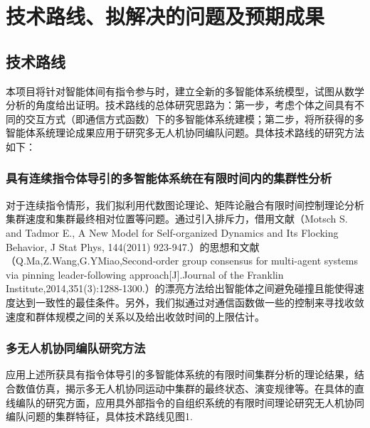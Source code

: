 
\section{技术路线、拟解决的问题及预期成果}

\subsection{技术路线}

本项目将针对智能体间有指令参与时，建立全新的多智能体系统模型，试图从数学分析的角度给出证明。技术路线的总体研究思路为：第一步，考虑个体之间具有不同的交互方式（即通信方式函数）下的多智能体系统建模；第二步，将所获得的多智能体系统理论成果应用于研究多无人机协同编队问题。具体技术路线的研究方法如下：

\subsubsection{具有连续指令体导引的多智能体系统在有限时间内的集群性分析}

对于连续指令情形，我们拟利用代数图论理论、矩阵论融合有限时间控制理论分析集群速度和集群最终相对位置等问题。通过引入排斥力，借用文献（Motsch S. and Tadmor E., A New Model for Self-organized Dynamics and Its Flocking Behavior, J Stat Phys, 144(2011) 923-947.）的思想和文献（Q.Ma,Z.Wang,G.YMiao,Second-order group consensus for multi-agent systems via pinning leader-following approach[J].Journal of the Franklin Institute,2014,351(3):1288-1300.）的漂亮方法给出智能体之间避免碰撞且能使得速度达到一致性的最佳条件。另外，我们拟通过对通信函数做一些的控制来寻找收敛速度和群体规模之间的关系以及给出收敛时间的上限估计。

\subsubsection{多无人机协同编队研究方法}

应用上述所获具有指令体导引的多智能体系统的有限时间集群分析的理论结果，结合数值仿真，揭示多无人机协同运动中集群的最终状态、演变规律等。在具体的直线编队的研究方面，应用具外部指令的自组织系统的有限时间理论研究无人机协同编队问题的集群特征，具体技术路线见图1.